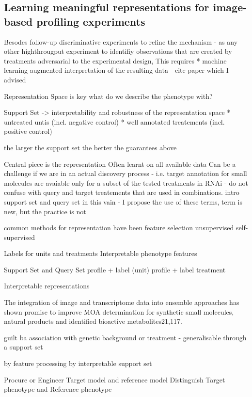 \begin{flushleft}
\subsection{Learning meaningful representations for image-based profiling experiments}

Besodes follow-up discriminative experiments to refine the mechanism - as any other highthrougput experiment to identifiy observations that are created by treatments adversarial to the experimental design, This requires 
* machine learning augmented interpretation of the resulting data - cite paper which I advised

Representation Space is key 
what do we describe the phenotype with?


Support Set -> interpretability and robustness of the representation space
* untreated untis (incl. negative control)
* well annotated treatements (incl. positive control)

the larger the support set the better the guarantees above

Central piece is the representation
Often learnt on all available data 
Can be a challenge if we are in an actual discovery process - i.e. target annotation for small molecules are avaiable only for a subset of the tested treatments 
in RNAi - do not confuse with query and target treatements that are used in combinations. 
intro support set and query set in this vain - I propose the use of these terms, term is new, but the practice is not

common methods for representation have been 
feature selection
unsupervised
self-supervised


Labels for units and treatments
Interpretable phenotype features

Support Set and Query Set
profile + label (unit)
profile + label treatment

Interpretable representations

The integration of image and transcriptome data into ensemble approaches has shown promise to improve MOA determination for synthetic small molecules, natural products and identified bioactive metabolites21,117.

guilt ba association with genetic background or treatment - generalisable through a support set 

by feature processing 
by interpretable support set

Procure or Engineer Target model and reference model
Distinguish Target phenotype and Reference phenotype



\end{flushleft}
